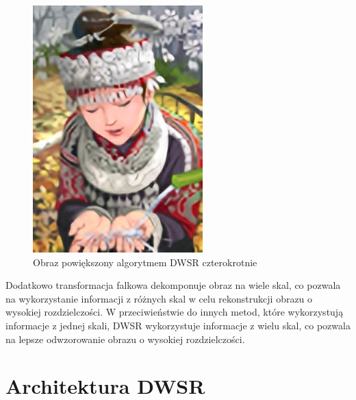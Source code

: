 \begin{figure}[ht]
\begin{minipage}[t]{0.35\linewidth}
        \includegraphics[width=\linewidth]{Rozdziały/02.Podstawy_teoretyczne/Obrazy/comic_DWSR_x4.png}
        \caption{Obraz powiększony algorytmem DWSR czterokrotnie}
        \label{fig:image47}
    \end{minipage}
\end{figure}

Dodatkowo transformacja falkowa dekomponuje obraz na wiele skal, co pozwala na wykorzystanie informacji z różnych skal w celu rekonstrukcji obrazu o wysokiej rozdzielczości. W przeciwieństwie do innych metod, które wykorzystują informacje z jednej skali, DWSR wykorzystuje informacje z wielu skal, co pozwala na lepsze odwzorowanie obrazu o wysokiej rozdzielczości.


\section{Architektura DWSR}


